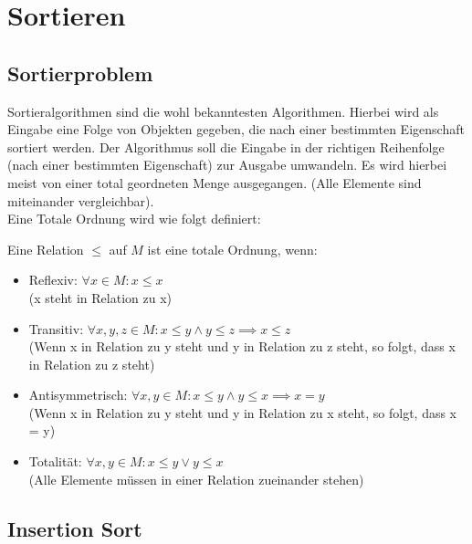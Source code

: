 \documentclass[
../AuD-Zusammenfassung.tex,
]
{subfiles}
\begin{document}
\section{Sortieren}
\subsection{Sortierproblem}
Sortieralgorithmen sind die wohl bekanntesten Algorithmen. Hierbei wird als Eingabe eine Folge von Objekten gegeben, die nach einer bestimmten Eigenschaft sortiert werden. Der Algorithmus soll die Eingabe in der richtigen Reihenfolge (nach einer bestimmten Eigenschaft) zur Ausgabe umwandeln. Es wird hierbei meist von einer total geordneten Menge ausgegangen. (Alle Elemente sind miteinander vergleichbar). \\
Eine Totale Ordnung wird wie folgt definiert:
\begin{center}
    Eine Relation $\leq$ auf $M$ ist eine totale Ordnung, wenn:
    \begin{itemize}
        \item Reflexiv: $\forall x \in M: x \leq x$ \\
        (x steht in Relation zu x)
        \item Transitiv: $\forall x,y,z \in M: x \leq y \wedge y \leq z \implies x \leq z$ \\
        (Wenn x in Relation zu y steht und y in Relation zu z steht, so folgt, dass x in Relation zu z steht)
        \item Antisymmetrisch: $\forall x,y \in M: x \leq y \wedge y \leq x \implies x = y$ \\
        (Wenn x in Relation zu y steht und y in Relation zu x steht, so folgt, dass x = y)
        \item Totalität: $\forall x,y \in M: x \leq y \vee y \leq x$ \\
        (Alle Elemente müssen in einer Relation zueinander stehen)
    \end{itemize}
\end{center}
\newpage
\subsection{Insertion Sort}
\begin{algorithm}[H]
\end{algorithm}
\end{document}
